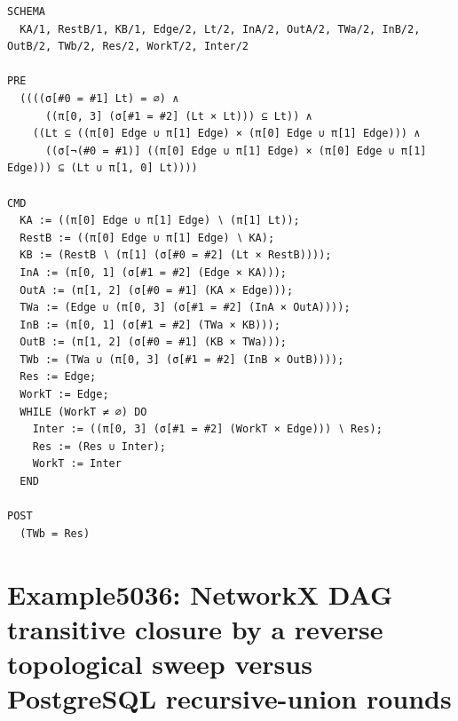 \documentclass[10pt]{article}
\begin{document}
\begin{Verbatim}[fontsize=\scriptsize,breaklines=true,breakanywhere=true,frame=single,framesep=1.5mm]
SCHEMA
  KA/1, RestB/1, KB/1, Edge/2, Lt/2, InA/2, OutA/2, TWa/2, InB/2, OutB/2, TWb/2, Res/2, WorkT/2, Inter/2

PRE
  ((((σ[#0 = #1] Lt) = ∅) ∧
      ((π[0, 3] (σ[#1 = #2] (Lt × Lt))) ⊆ Lt)) ∧
    ((Lt ⊆ ((π[0] Edge ∪ π[1] Edge) × (π[0] Edge ∪ π[1] Edge))) ∧
      ((σ[¬(#0 = #1)] ((π[0] Edge ∪ π[1] Edge) × (π[0] Edge ∪ π[1] Edge))) ⊆ (Lt ∪ π[1, 0] Lt))))

CMD
  KA := ((π[0] Edge ∪ π[1] Edge) ∖ (π[1] Lt));
  RestB := ((π[0] Edge ∪ π[1] Edge) ∖ KA);
  KB := (RestB ∖ (π[1] (σ[#0 = #2] (Lt × RestB))));
  InA := (π[0, 1] (σ[#1 = #2] (Edge × KA)));
  OutA := (π[1, 2] (σ[#0 = #1] (KA × Edge)));
  TWa := (Edge ∪ (π[0, 3] (σ[#1 = #2] (InA × OutA))));
  InB := (π[0, 1] (σ[#1 = #2] (TWa × KB)));
  OutB := (π[1, 2] (σ[#0 = #1] (KB × TWa)));
  TWb := (TWa ∪ (π[0, 3] (σ[#1 = #2] (InB × OutB))));
  Res := Edge;
  WorkT := Edge;
  WHILE (WorkT ≠ ∅) DO
    Inter := ((π[0, 3] (σ[#1 = #2] (WorkT × Edge))) ∖ Res);
    Res := (Res ∪ Inter);
    WorkT := Inter
  END

POST
  (TWb = Res)
\end{Verbatim}

\Needspace{0.45\textheight}

\section{Example5036: NetworkX DAG transitive closure by a reverse topological sweep versus PostgreSQL recursive-union rounds}\label{case:Example5036}
\end{document}
